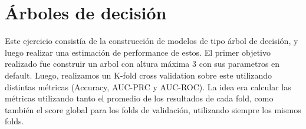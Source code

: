 \section*{Árboles de decisión}

Este ejercicio consistía de la construcción de modelos de tipo árbol de decisión, y luego realizar una estimación de performance de estos.
El primer objetivo realizado fue construir un arbol con altura máxima 3 con sus parametros en default. Luego, realizamos un K-fold cross validation sobre este utilizando distintas métricas (Accuracy, AUC-PRC y AUC-ROC). La idea era calcular las métricas utilizando tanto el promedio de los resultados de cada fold, como también el score global para los folds de validación, utilizando siempre los mismos folds.

\begin{table}[h!]
\centering
{}
\caption*{Resultados de validación cruzada}
\label{tab:resultados_cv}
\end{table}

